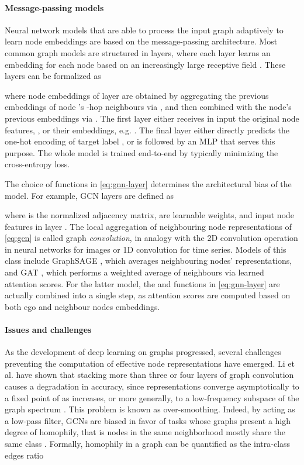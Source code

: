 \documentclass[final,5p,times,twocolumn]{elsarticle}
\begin{document}
\paragraph{Message-passing models}

Neural network models that are able to process the input graph adaptively to learn node embeddings are based on the message-passing architecture.
Most common graph models are structured in  layers, where each layer learns an embedding for each node based on an increasingly large receptive field \cite{Micheli2009}.
These layers  can be formalized as \cite{Xu2019}

where node embeddings  of layer  are obtained by aggregating the previous embeddings  of node 's -hop neighbours via , and then combined with the node's previous embeddings  via .
The first layer  either receives in input the original node features, , or their embeddings, e.g.  .
The final layer  either directly predicts the one-hot encoding of target label , or is followed by an MLP that serves this purpose.
The whole model is trained end-to-end by typically minimizing the cross-entropy loss.

The choice of functions in \eqref{eq:gnn-layer} determines the architectural bias of the model.
For example, GCN \cite{Kipf2017} layers are defined as

where  is the normalized adjacency matrix,  are learnable weights, and input node features  in layer .
The local aggregation of neighbouring node representations of \eqref{eq:gcn} is called graph \emph{convolution}, in analogy with the 2D convolution operation in neural networks for images or 1D convolution for time series.
Models of this class include GraphSAGE \cite{Hamilton2017}, which averages neighbouring nodes' representations, and GAT \cite{Velickovic2018}, which performs a weighted average of neighbours via learned attention scores.
For the latter model, the  and  functions in \eqref{eq:gnn-layer} are actually combined into a single step, as attention scores are computed based on both ego and neighbour nodes embeddings.

\paragraph{Issues and challenges}

As the development of deep learning on graphs progressed, several challenges preventing the computation of effective node representations have emerged.
Li et al. \cite{Li2018} have shown that stacking more than three or four layers of graph convolution causes a degradation in accuracy, since representations  converge asymptotically to a fixed point of  as  increases, or more generally, to a low-frequency subspace of the graph spectrum \cite{Oono2020}.
This problem is known as over-smoothing.
Indeed, by acting as a low-pass filter, GCNs are biased in favor of tasks whose graphs present a high degree of homophily, that is nodes in the same neighborhood mostly share the same class \citep{Zhu2020}.
Formally, homophily in a graph can be quantified as the intra-class edges ratio
\end{document}
